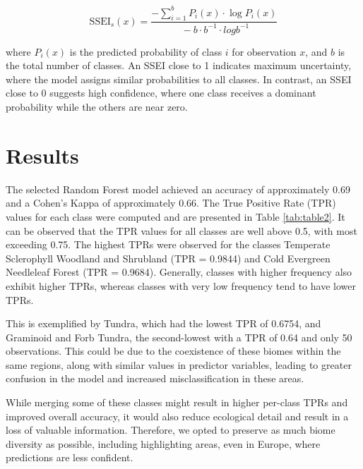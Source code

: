 \documentclass[
]{krantz}
\begin{document}
\[
\text{SSEI}_s(x) = \frac{-\sum_{i=1}^{b} P_i(x) \cdot \log P_i(x)}{\ -b \cdot b^{-1}\cdot log{b^{-1}}}
\]

where \(P_i(x)\) is the predicted probability of class \(i\) for observation \(x\), and \(b\) is the total number of classes. An SSEI close to 1 indicates maximum uncertainty, where the model assigns similar probabilities to all classes. In contrast, an SSEI close to 0 suggests high confidence, where one class receives a dominant probability while the others are near zero.

\section{Results}\label{results-2}

The selected Random Forest model achieved an accuracy of approximately 0.69 and a Cohen's Kappa of approximately 0.66. The True Positive Rate (TPR) values for each class were computed and are presented in Table \ref{tab:table2}. It can be observed that the TPR values for all classes are well above 0.5, with most exceeding 0.75. The highest TPRs were observed for the classes Temperate Sclerophyll Woodland and Shrubland (TPR = 0.9844) and Cold Evergreen Needleleaf Forest (TPR = 0.9684). Generally, classes with higher frequency also exhibit higher TPRs, whereas classes with very low frequency tend to have lower TPRs.

This is exemplified by Tundra, which had the lowest TPR of 0.6754, and Graminoid and Forb Tundra, the second-lowest with a TPR of 0.64 and only 50 observations. This could be due to the coexistence of these biomes within the same regions, along with similar values in predictor variables, leading to greater confusion in the model and increased misclassification in these areas.

While merging some of these classes might result in higher per-class TPRs and improved overall accuracy, it would also reduce ecological detail and result in a loss of valuable information. Therefore, we opted to preserve as much biome diversity as possible, including highlighting areas, even in Europe, where predictions are less confident.
\end{document}
